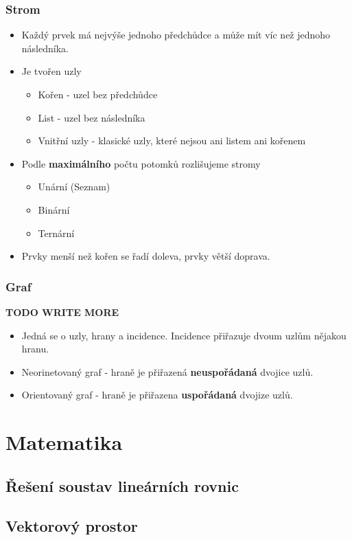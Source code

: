 \documentclass[10pt,a4paper]{article}
\begin{document}
\subsubsection{Strom}
\begin{itemize}
\item Každý prvek má nejvýše jednoho předchůdce a může mít víc než jednoho následníka.
\item Je tvořen uzly
\begin{itemize}
\item Kořen - uzel bez předchůdce
\item List - uzel bez následníka
\item Vnitřní uzly - klasické uzly, které nejsou ani listem ani kořenem
\end{itemize}
\item Podle \textbf{maximálního} počtu potomků rozlišujeme stromy
\begin{itemize}
\item Unární (Seznam)
\item Binární
\item Ternární
\end{itemize}
\item Prvky menší než kořen se řadí doleva, prvky větší doprava.
\end{itemize}

\subsubsection{Graf}
\textbf{TODO WRITE MORE}

\begin{itemize}
\item Jedná se o uzly, hrany a incidence. Incidence přiřazuje dvoum uzlům nějakou hranu.
\item Neorinetovaný graf - hraně je přiřazená \textbf{neuspořádaná} dvojice uzlů.
\item Orientovaný graf - hraně je přiřazena \textbf{uspořádaná} dvojize uzlů.
\end{itemize}
\newpage
\section{Matematika}
\subsection{Řešení soustav lineárních rovnic}
\subsection{Vektorový prostor}
\end{document}
